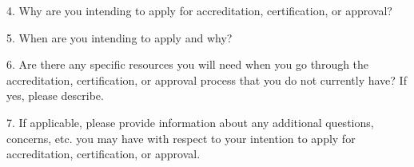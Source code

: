 4. Why are you intending to apply for accreditation, certification, or approval?


5. When are you intending to apply and why?


6. Are there any specific resources you will need when you go through the accreditation, certification, or approval process that you do not currently have? If yes, please describe.


7. If applicable, please provide information about any additional questions, concerns, etc. you may have with respect to your intention to apply for accreditation, certification, or approval.






























